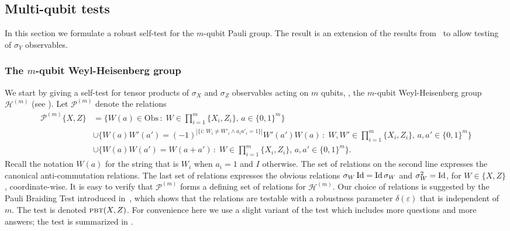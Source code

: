 \documentclass{toc}
\newcommand{\Id}{\ensuremath{\mathop{\rm Id}\nolimits}}
\newcommand{\setft}[1]{\mathrm{#1}}
\newcommand{\Obs}{\setft{Obs}}
\newcommand{\eps}{\varepsilon}
\newcommand{\pbt}{\textsc{pbt}}
\newcommand{\paulin}{\mathcal{P}^{(m)}\!}
\begin{document}
\subsection{Multi-qubit tests}
\label{sec:pauli-group}


In this section we formulate a robust self-test for the $m$-qubit Pauli group. The result is an extension of the results from~\cite{natarajan2016robust} to allow testing of $\sigma_Y$ observables. 

\subsubsection{The \texorpdfstring{$m$}{m}-qubit Weyl-Heisenberg group}
\label{sec:pbt}


We start by giving a self-test for tensor products of $\sigma_X$ and $\sigma_Z$ 
observables acting on $m$ qubits, \ie, the $m$-qubit Weyl-Heisenberg group $\mathcal{H}^{(m)}$ (see ). 
Let $\mathcal{P}^{(m)}$ denote the relations  
\begin{align*}
\paulin\{X,Z\} &= \Big\{ W(a)\in\Obs\,: \;W \in \prod_{i=1}^m \{X_i,Z_i\},\,a\in\{0,1\}^m\Big\}\\
&\cup \Big\{W(a)W'(a')=(-1)^{|\{i:\,W_i\neq W'_i \wedge a_ia'_i=1\}|} W'(a')W(a)\,:\;W,W' \in \prod_{i=1}^m \{X_i,Z_i\},\, a,a'\in\{0,1\}^m\Big\}\\
& \cup\Big\{ W(a)W(a')=W(a+a')\,:\;W \in \prod_{i=1}^m \{X_i,Z_i\},\, a,a'\in\{0,1\}^m\Big\}.
\end{align*}
Recall the notation $W(a)$ for the string that is $W_i$ when $a_i=1$ and $I$ otherwise. 
The set of relations on the second line expresses the canonical anti-commutation relations. The last set of relations expresses the obvious relations $\sigma_W \Id = \Id \sigma_W$ and $\sigma_W^2 = \Id$, for $W\in\{X,Z\}$, coordinate-wise. It is easy to verify that $\mathcal{P}^{(m)}$ forms a defining set of relations for $\mathcal{H}^{(m)}$. Our choice of relations is suggested by the Pauli Braiding Test introduced in~\cite{natarajan2016robust}, which shows that the relations are testable with a robustness parameter $\delta(\eps)$ that is independent of $m$. 
The  test is denoted $\pbt(X,Z)$. For convenience here we use a slight variant of the test which includes more questions and more answers; the test is summarized in . 
\end{document}
